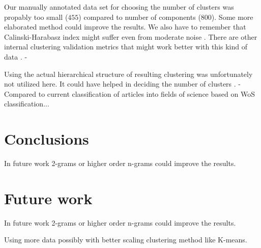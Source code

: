 Our manually annotated data set for choosing the number of clusters
was propably too small ($455$) compared to number of components 
($800$). Some more elaborated method could improve the results. 
We also have to remember that Calinski-Harabasz index might suffer
even from moderate noise \cite{liu_understanding_2010}.
There are other internal clustering validation metrics that might 
work better with this kind of data \cite{liu_understanding_2010}.
- 

Using the actual hierarchical structure of resulting clustering 
was unfortunately not utilized here. It could have helped in 
deciding the number of clusters \cite{kimes_statistical_2017}.
- Compared to current classification of articles into fields of 
science based on WoS classification...





\section*{Conclusions}
\label{sec:conclusions}
In future work 2-grams or higher order n-grams could improve the 
results.


\section*{Future work}
\label{sec:future}
In future work 2-grams or higher order n-grams could improve the 
results.

Using more data possibly with better scaling clustering method like 
K-means.
